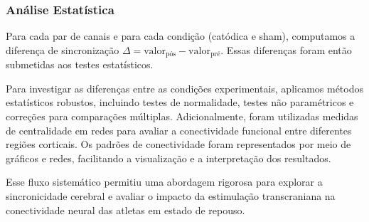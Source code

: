 \subsubsection{Análise Estatística} 
Para cada par de canais e para cada condição (catódica e sham), computamos a diferença de sincronização \(\Delta = \text{valor}_{\text{pós}} - \text{valor}_{\text{pré}}\). Essas diferenças foram então submetidas aos testes estatísticos.

Para investigar as diferenças entre as condições experimentais, aplicamos métodos estatísticos robustos, incluindo testes de normalidade, testes não paramétricos e correções para comparações múltiplas. Adicionalmente, foram utilizadas medidas de centralidade em redes para avaliar a conectividade funcional entre diferentes regiões corticais. Os padrões de conectividade foram representados por meio de gráficos e redes, facilitando a visualização e a interpretação dos resultados.

Esse fluxo sistemático permitiu uma abordagem rigorosa para explorar a sincronicidade cerebral e avaliar o impacto da estimulação transcraniana na conectividade neural das atletas em estado de repouso.
